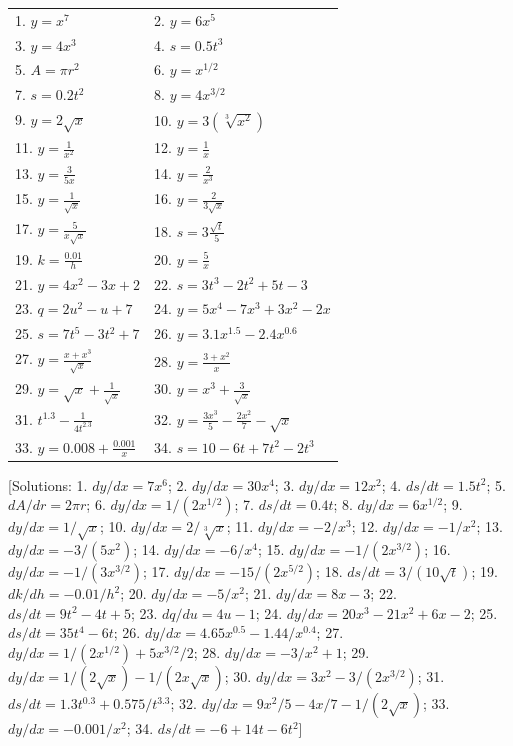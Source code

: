 \documentclass[
  11pt,
  oneside]{book}
\newcommand{\slide}{}
\theoremstyle{definition}
\theoremstyle{definition}
\theoremstyle{definition}
\theoremstyle{definition}
\theoremstyle{remark}
\begin{document}
\begin{tabular}{l|l}
\hline
 & \\
\hline
1. $y=x^7$ & 2. $y=6x^5$\\
\hline
3. $y=4x^3$ & 4. $s=0.5t^3$\\
\hline
5. $A=\pi r^2$ & 6. $y=x^{1/2}$\\
\hline
7. $s=0.2t^2$ & 8. $y=4x^{3/2}$\\
\hline
9. $y=2\sqrt{x}$ & 10. $y=3(\sqrt[3]{x^2})$\\
\hline
11. $y=\frac1{x^2}$ & 12. $y=\frac 1x$\\
\hline
13. $y=\frac3{5x}$ & 14. $y=\frac2{x^3}$\\
\hline
15. $y=\frac1{\sqrt{x}}$ & 16. $y=\frac2{3\sqrt{x}}$\\
\hline
17. $y=\frac5{x\sqrt{x}}$ & 18. $s=3\frac{\sqrt{t}}5$\\
\hline
19. $k=\frac{0.01}{h}$ & 20. $y=\frac5x$\\
\hline
21. $y=4x^2-3x+2$ & 22. $s=3t^3-2t^2+5t-3$\\
\hline
23. $q=2u^2-u+7$ & 24. $y=5x^4-7x^3+3x^2-2x$\\
\hline
25. $s=7t^5-3t^2+7$ & 26. $y=3.1x^{1.5}-2.4x^{0.6}$\\
\hline
27. $y=\frac{x+x^3}{\sqrt{x}}$ & 28. $y=\frac{3+x^2}x$\\
\hline
29. $y=\sqrt{x}+\frac1{\sqrt{x}}$ & 30. $y=x^3+\frac3{\sqrt{x}}$\\
\hline
31. $t^{1.3}-\frac1{4t^{2.3}}$ & 32. $y=\frac{3x^3}5-\frac{2x^2}7-\sqrt{x}$\\
\hline
33. $y=0.008+\frac{0.001}{x}$ & 34. $s=10-6t+7t^2-2t^3$\\
\hline
\end{tabular}
\slide

{[}Solutions: 1. \(dy/dx=7x^6\); 2. \(dy/dx=30x^4\); 3. \(dy/dx=12x^2\); 4. \(ds/dt=1.5t^2\); 5. \(dA/dr=2\pi r\); 6. \(dy/dx=1/(2x^{1/2})\); 7. \(ds/dt=0.4t\); 8. \(dy/dx=6x^{1/2}\); 9. \(dy/dx=1/\sqrt{x}\); 10. \(dy/dx=2/\sqrt[3]{x}\); 11. \(dy/dx=-2/x^3\); 12. \(dy/dx=-1/x^2\); 13. \(dy/dx=-3/(5x^2)\); 14. \(dy/dx=-6/x^4\); 15. \(dy/dx=-1/(2x^{3/2})\); 16. \(dy/dx=-1/(3x^{3/2})\); 17. \(dy/dx=-15/(2x^{5/2})\); 18. \(ds/dt=3/(10\sqrt{t})\); 19. \(dk/dh=-0.01/h^2\); 20. \(dy/dx=-5/x^2\); 21. \(dy/dx=8x-3\); 22. \(ds/dt=9t^2-4t+5\); 23. \(dq/du=4u-1\); 24. \(dy/dx=20x^3-21x^2+6x-2\); 25. \(ds/dt=35t^4-6t\); 26. \(dy/dx=4.65x^{0.5}-1.44/x^{0.4}\); 27. \(dy/dx=1/(2x^{1/2})+5x^{3/2}/2\); 28. \(dy/dx=-3/x^2+1\); 29. \(dy/dx=1/(2\sqrt{x})-1/(2x\sqrt{x})\); 30. \(dy/dx=3x^2-3/(2x^{3/2})\); 31. \(ds/dt=1.3t^{0.3}+0.575/t^{3.3}\); 32. \(dy/dx=9x^2/5-4x/7-1/(2\sqrt{x})\); 33. \(dy/dx=-0.001/x^2\); 34. \(ds/dt=-6+14t-6t^2\){]}
\end{document}

